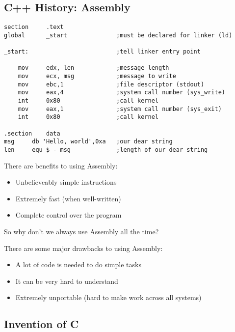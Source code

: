 \documentclass[12pt]{article}
\begin{document}
\subsection{C++ History: Assembly}

\begin{minipage}{\linewidth}
\begin{lstlisting}[caption=Hello world in Assembly]
section     .text
global      _start              ;must be declared for linker (ld)

_start:                         ;tell linker entry point

    mov     edx, len            ;message length
    mov     ecx, msg            ;message to write
    mov     ebc,1               ;file descriptor (stdout)
    mov     eax,4               ;system call number (sys_write)
    int     0x80                ;call kernel
    mov     eax,1               ;system call number (sys_exit)
    int     0x80                ;call kernel

.section    data
msg     db 'Hello, world',0xa   ;our dear string
len     equ $ - msg             ;length of our dear string
\end{lstlisting}
\end{minipage}

\begin{question}
    There are benefits to using Assembly:
\begin{itemize}
    \item Unbelieveably simple instructions
    \item Extremely fast (when well-written)
    \item Complete control over the program
\end{itemize}
So why don't we always use Assembly all the time?
\end{question}

\begin{answer}
There are some major drawbacks to using Assembly:
\begin{itemize}
    \item A lot of code is needed to do simple tasks
    \item It can be very hard to understand
    \item Extremely unportable (hard to make work across all systems)
\end{itemize}
\end{answer}

\subsection{Invention of C}
\end{document}
